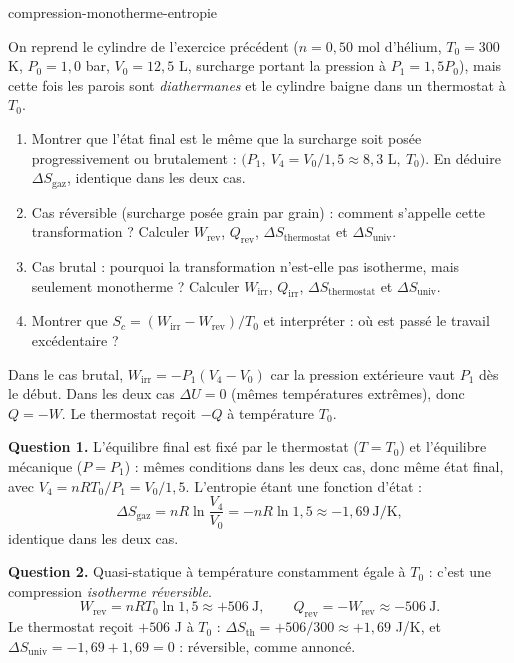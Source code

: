 \begin{exo}{compression-monotherme-entropie}

On reprend le cylindre de l'exercice précédent ($n = 0{,}50$ mol d'hélium, $T_0 = 300$ K, $P_0 = 1{,}0$ bar, $V_0 = 12{,}5$ L, surcharge portant la pression à $P_1 = 1{,}5P_0$), mais cette fois les parois sont \emph{diathermanes} et le cylindre baigne dans un thermostat à $T_0$.

\begin{enumerate}
\item Montrer que l'état final est le même que la surcharge soit posée progressivement ou brutalement : $(P_1,\ V_4 = V_0/1{,}5 \approx 8{,}3$ L$,\ T_0)$. En déduire $\Delta S_{\text{gaz}}$, identique dans les deux cas.
\item Cas réversible (surcharge posée grain par grain) : comment s'appelle cette transformation ? Calculer $W_{\text{rev}}$, $Q_{\text{rev}}$, $\Delta S_{\text{thermostat}}$ et $\Delta S_{\text{univ}}$.
\item Cas brutal : pourquoi la transformation n'est-elle pas isotherme, mais seulement monotherme ? Calculer $W_{\text{irr}}$, $Q_{\text{irr}}$, $\Delta S_{\text{thermostat}}$ et $\Delta S_{\text{univ}}$.
\item Montrer que $S_c = (W_{\text{irr}} - W_{\text{rev}})/T_0$ et interpréter : où est passé le travail excédentaire ?
\end{enumerate}

\begin{indication}
Dans le cas brutal, $W_{\text{irr}} = -P_1(V_4 - V_0)$ car la pression extérieure vaut $P_1$ dès le début. Dans les deux cas $\Delta U = 0$ (mêmes températures extrêmes), donc $Q = -W$. Le thermostat reçoit $-Q$ à température $T_0$.
\end{indication}

\begin{solution}
\textbf{Question 1.} L'équilibre final est fixé par le thermostat ($T = T_0$) et l'équilibre mécanique ($P = P_1$) : mêmes conditions dans les deux cas, donc même état final, avec $V_4 = nRT_0/P_1 = V_0/1{,}5$. L'entropie étant une fonction d'état :
\[
\Delta S_{\text{gaz}} = nR\ln\frac{V_4}{V_0} = -nR\ln 1{,}5 \approx -1{,}69\ \text{J/K},
\]
identique dans les deux cas.

\textbf{Question 2.} Quasi-statique à température constamment égale à $T_0$ : c'est une compression \emph{isotherme réversible}.
\[
W_{\text{rev}} = nRT_0\ln 1{,}5 \approx +506\ \text{J}, \qquad Q_{\text{rev}} = -W_{\text{rev}} \approx -506\ \text{J}.
\]
Le thermostat reçoit $+506$ J à $T_0$ : $\Delta S_{\text{th}} = +506/300 \approx +1{,}69$ J/K, et $\Delta S_{\text{univ}} = -1{,}69 + 1{,}69 = 0$ : réversible, comme annoncé.


\end{solution}
\end{exo}
